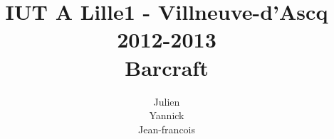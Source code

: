\documentclass[12pt,a4paper]{report}
\title
{
	\normalsize{IUT A Lille1 - Villneuve-d'Ascq\\
	2012-2013}\\
	\vspace{15mm}
  \Huge{Barcraft
    \vspace{15mm}}
}
\author{
\bsc{Stechele} Julien\\
\bsc{Vanuxem} Yannick\\
\bsc{Serir} Jean-francois\\
	\vspace{30mm}
}
\begin{document}

\maketitle

%

\renewcommand{\contentsname}{Sommaire}


%

%

%

%

%

%

\appendix

\end{document}

